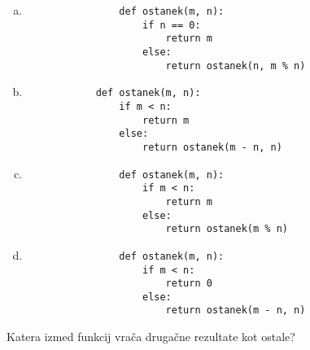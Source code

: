 \documentclass[arhiv, 10pt]{../izpit}
\begin{document}
        \begin{multicols}{2}
        \begin{enumerate}[(a)]
\item 
                \begin{verbatim}
                def ostanek(m, n):
                    if n == 0:
                        return m
                    else:
                        return ostanek(n, m % n)
                \end{verbatim}
            
\item 
            \begin{verbatim}
            def ostanek(m, n):
                if m < n:
                    return m
                else:
                    return ostanek(m - n, n)
            \end{verbatim}
        
\item 
                \begin{verbatim}
                def ostanek(m, n):
                    if m < n:
                        return m
                    else:
                        return ostanek(m % n)
                \end{verbatim}
            
\item 
                \begin{verbatim}
                def ostanek(m, n):
                    if m < n:
                        return 0
                    else:
                        return ostanek(m - n, n)
                \end{verbatim}
            
\end{enumerate}

        \end{multicols}
    
        \naloga*
        
        Katera izmed funkcij vrača drugačne rezultate kot ostale?
    
\end{document}
